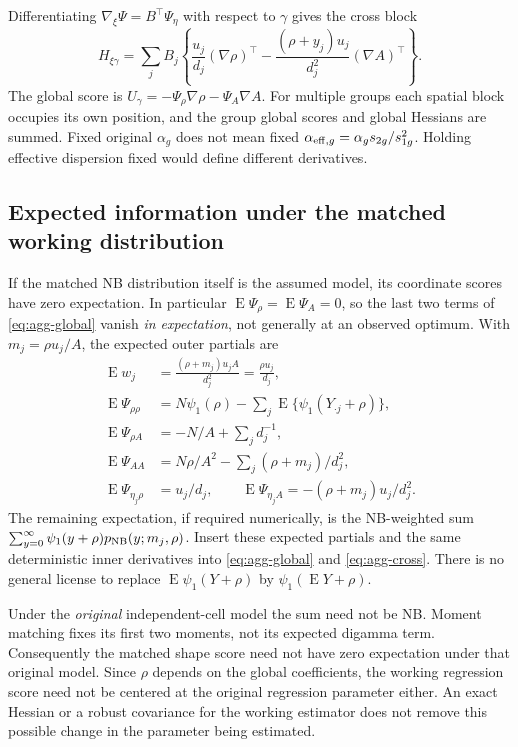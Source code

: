 \documentclass[11pt,a4paper]{article}
\newcommand{\E}{\operatorname{E}}
\numberwithin{equation}{section}
\begin{document}
Differentiating $\nabla_\xi\Psi=B^\top\Psi_\eta$ with respect to $\gamma$
gives the cross block
\begin{equation}
 H_{\xi\gamma}
 =\sum_j B_j\left\{
       \frac{u_j}{d_j}(\nabla\rho)^\top
       -\frac{(\rho+y_j)u_j}{d_j^2}(\nabla A)^\top\right\}.
 \label{eq:agg-cross}
\end{equation}
The global score is $U_\gamma=-\Psi_\rho\nabla\rho-\Psi_A\nabla A$.
For multiple groups each spatial block occupies its own position, and
the group global scores and global Hessians are summed.
Fixed original $\alpha_g$ does not mean fixed
$\alpha_{{\rm eff},g}=\alpha_gs_{2g}/s_{1g}^2$.
Holding effective dispersion fixed would define different derivatives.

\subsection{Expected information under the matched working distribution}
If the matched NB distribution itself is the assumed model, its
coordinate scores have zero expectation. In particular
$\E\Psi_\rho=\E\Psi_A=0$, so the last two terms of
\eqref{eq:agg-global} vanish \emph{in expectation}, not generally
at an observed optimum. With $m_j=\rho u_j/A$, the expected outer
partials are
\begin{align}
 \E w_j&=\frac{(\rho+m_j)u_jA}{d_j^2}
                  =\frac{\rho u_j}{d_j},\\
 \E\Psi_{\rho\rho}
 &=N\psi_1(\rho)-\sum_j\E\{\psi_1(Y_{\cdot j}+\rho)\},\\
 \E\Psi_{\rho A}&=-N/A+\sum_jd_j^{-1},\\
 \E\Psi_{AA}&=N\rho/A^2-\sum_j(\rho+m_j)/d_j^2,\\
 \E\Psi_{\eta_j\rho}&=u_j/d_j,\qquad
 \E\Psi_{\eta_j A}=-(\rho+m_j)u_j/d_j^2 .
\end{align}
The remaining expectation, if required numerically, is the NB-weighted
sum $\sum_{y=0}^\infty\psi_1(y+\rho)p_{\rm NB}(y;m_j,\rho)$.
Insert these expected partials and the same deterministic inner
derivatives into \eqref{eq:agg-global} and \eqref{eq:agg-cross}.
There is no general license to replace
$\E\psi_1(Y+\rho)$ by $\psi_1(\E Y+\rho)$.

Under the \emph{original} independent-cell model the sum need not be
NB. Moment matching fixes its first two moments, not its expected
digamma term. Consequently the matched shape score need not have
zero expectation under that original model. Since $\rho$ depends on
the global coefficients, the working regression score need not be
centered at the original regression parameter either.
An exact Hessian or a robust covariance for the working estimator
does not remove this possible change in the parameter being estimated.
\end{document}

